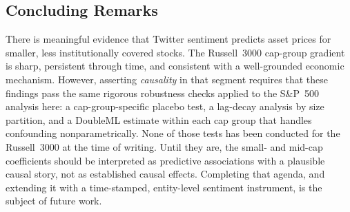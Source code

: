 \subsection{Concluding Remarks}\label{concluding-remarks}

There is meaningful evidence that Twitter sentiment predicts asset prices for
smaller, less institutionally covered stocks. The Russell~3000 cap-group
gradient is sharp, persistent through time, and consistent with a
well-grounded economic mechanism. However, asserting \emph{causality} in that
segment requires that these findings pass the same rigorous robustness checks
applied to the S\&P~500 analysis here: a cap-group-specific placebo test, a
lag-decay analysis by size partition, and a DoubleML estimate within each
cap group that handles confounding nonparametrically. None of those tests has
been conducted for the Russell~3000 at the time of writing. Until they are,
the small- and mid-cap coefficients should be interpreted as predictive
associations with a plausible causal story, not as established causal effects.
Completing that agenda, and extending it with a time-stamped, entity-level
sentiment instrument, is the subject of future work.
